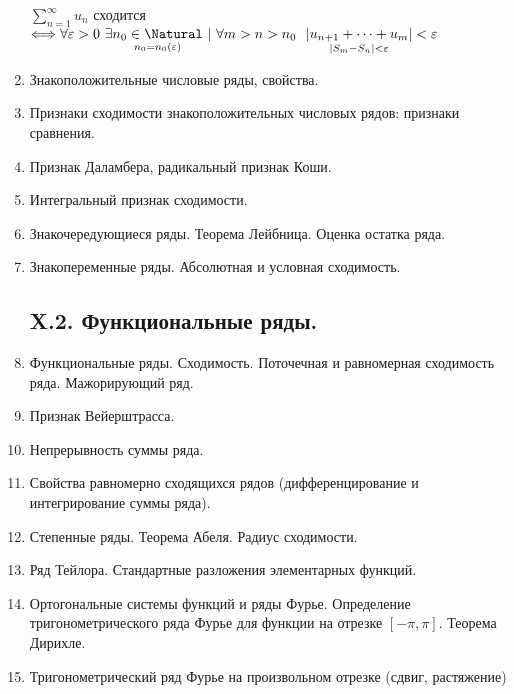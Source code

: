 \begin{enumerate}
    \begin{MyTheorem}
        \Ths $\sum_{n = 1}^\infty u_n$ сходится $\Longleftrightarrow \forall \varepsilon > 0 \ \exists \underset{n_0 = n_0 (\varepsilon)}{n_0 \in \Natural} \ | \ \forall m > n > n_0 \ \ \underset{|S_m - S_n| < \varepsilon}{|u_{n + 1} + \dots + u_m|} < \varepsilon$
    \end{MyTheorem}


    \item Знакоположительные числовые ряды, свойства.
    \item Признаки сходимости знакоположительных числовых рядов: признаки сравнения.
    \item Признак Даламбера, радикальный признак Коши.
    \item Интегральный признак сходимости.
    \item Знакочередующиеся ряды. Теорема Лейбница. Оценка остатка ряда.
    \item Знакопеременные ряды. Абсолютная и условная сходимость.

\subsection{X.2. Функциональные ряды.}

    \item Функциональные ряды. Сходимость. Поточечная и равномерная сходимость ряда.
    Мажорирующий ряд.
    \item Признак Вейерштрасса.
    \item Непрерывность суммы ряда.
    \item Свойства равномерно сходящихся рядов (дифференцирование и интегрирование суммы
    ряда).
    \item Степенные ряды. Теорема Абеля. Радиус сходимости.
    \item Ряд Тейлора. Стандартные разложения элементарных функций.
    \item Ортогональные системы функций и ряды Фурье. Определение тригонометрического ряда
    Фурье для функции на отрезке $[-\pi, \pi]$. Теорема Дирихле.
    \item Тригонометрический ряд Фурье на произвольном отрезке (сдвиг, растяжение)
\end{enumerate}